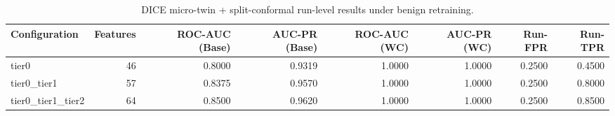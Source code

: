 \begin{table}[t]
\centering
\caption{DICE micro-twin + split-conformal run-level results under benign retraining.}
\label{tab:dice_full_overall}
\footnotesize
\begin{tabular}{lrrrrrrr}
\toprule
Configuration & Features & ROC-AUC (Base) & AUC-PR (Base) & ROC-AUC (WC) & AUC-PR (WC) & Run-FPR & Run-TPR \\
\midrule
tier0 & 46 & 0.8000 & 0.9319 & 1.0000 & 1.0000 & 0.2500 & 0.4500 \\
tier0_tier1 & 57 & 0.8375 & 0.9570 & 1.0000 & 1.0000 & 0.2500 & 0.8000 \\
tier0_tier1_tier2 & 64 & 0.8500 & 0.9620 & 1.0000 & 1.0000 & 0.2500 & 0.8500 \\
\bottomrule
\end{tabular}

\end{table}
